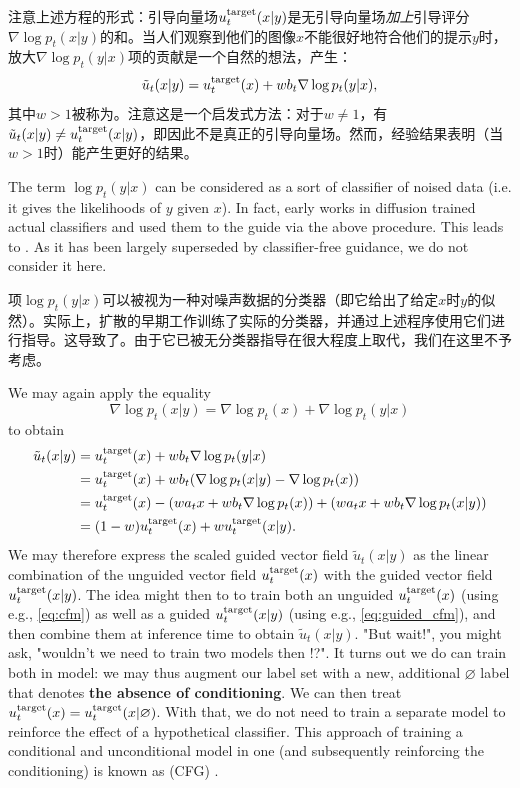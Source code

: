 注意上述方程的形式：引导向量场$u^{\text{target}}_t(x|y)$是无引导向量场\emph{加上}引导评分$\nabla\log p_t(x|y)$的和。当人们观察到他们的图像$x$不能很好地符合他们的提示$y$时，放大$\nabla \log p_t(y|x)$项的贡献是一个自然的想法，产生：
\begin{align*}
    \tilde{u}_t(x|y) = u^{\text{target}}_t(x) + w b_t \nabla \log p_t(y|x),
\end{align*}
其中$w > 1$被称为。注意这是一个启发式方法：对于$w \neq 1$，有$\tilde{u}_t(x|y) \neq u^{\text{target}}_t(x|y)$，即因此不是真正的引导向量场。然而，经验结果表明（当$w > 1$时）能产生更好的结果。 
\begin{remarkbox}
The term $\log p_t(y|x)$ can be considered as a sort of classifier of noised data (i.e. it gives the likelihoods of $y$ given $x$). In fact, early works in diffusion trained actual classifiers and used them to the guide via the above procedure. This leads to  \cite{classifier_guidance, yangsong_sde}. As it has been largely superseded by classifier-free guidance, we do not consider it here. 

项$\log p_t(y|x)$可以被视为一种对噪声数据的分类器（即它给出了给定$x$时$y$的似然）。实际上，扩散的早期工作训练了实际的分类器，并通过上述程序使用它们进行指导。这导致了\cite{classifier_guidance, yangsong_sde}。由于它已被无分类器指导在很大程度上取代，我们在这里不予考虑。
\end{remarkbox}

We may again apply the equality $$\nabla \log p_t(x|y) = \nabla \log p_t(x) + \nabla \log p_t(y|x)$$ to obtain 
\begin{align*}\tilde{u}_t(x|y) &= u^{\text{target}}_t(x) + w b_t \nabla \log p_t(y|x)\\
&= u^{\text{target}}_t(x) + w b_t (\nabla \log p_t(x|y) - \nabla \log p_t(x))\\
&= u^{\text{target}}_t(x) - (w a_tx + w b_t \nabla \log p_t(x)) + (w a_t x + w b_t \nabla \log p_t(x|y))\\
&= (1-w) u^{\text{target}}_t(x) + w u^{\text{target}}_t(x|y).\end{align*}
We may therefore express the scaled guided vector field $\tilde{u}_t(x|y)$ as the linear combination of the unguided vector field $u^{\text{target}}_t(x)$ with the guided vector field $u^{\text{target}}_t(x|y)$. The idea might then to to train both an unguided $u^{\text{target}}_t(x)$ (using e.g., \cref{eq:cfm}) as well as a guided $u^{\text{target}}_t(x|y)$ (using e.g., \cref{eq:guided_cfm}), and then combine them at inference time to obtain $\tilde{u}_t(x|y)$. "But wait!", you might ask, "wouldn't we need to train two models then !?". It turns out we do can train both in model: we may thus augment our label set with a new, additional $\varnothing$ label that denotes \textbf{the absence of conditioning}. We can then treat $u^{\text{target}}_t(x)=u^{\text{target}}_t(x|\varnothing)$. With that, we do not need to train a separate model to reinforce the effect of a hypothetical classifier. This approach of training a conditional and unconditional model in one (and subsequently reinforcing the conditioning) is known as  (CFG) \cite{cfg}.

